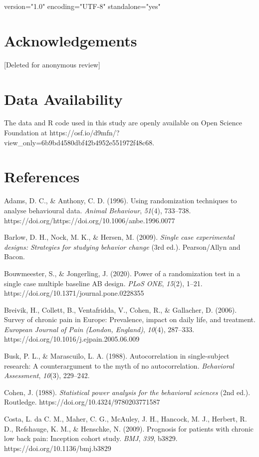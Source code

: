 version="1.0" encoding="UTF-8" standalone="yes" \documentclass{article}
\begin{document}
\section{Acknowledgements}

[Deleted for anonymous review]

\section{Data Availability}

The data and R code used in this study are openly available on Open Science Foundation at https://osf.io/d9mfn/?view\_only=6b9bd4580dbf42b4952e551972f48c68.



\section{References}

Adams, D. C., \& Anthony, C. D. (1996). Using randomization techniques to analyse behavioural data. \emph{Animal Behaviour}, \emph{51}(4), 733--738. https://doi.org/https://doi.org/10.1006/anbe.1996.0077

Barlow, D. H., Nock, M. K., \& Hersen, M. (2009). \emph{Single case experimental designs: Strategies for studying behavior change} (3rd ed.). Pearson/Allyn and Bacon.

Bouwmeester, S., \& Jongerling, J. (2020). Power of a randomization test in a single case multiple baseline AB design. \emph{PLoS ONE}, \emph{15}(2), 1--21. https://doi.org/10.1371/journal.pone.0228355

Breivik, H., Collett, B., Ventafridda, V., Cohen, R., \& Gallacher, D. (2006). Survey of chronic pain in Europe: Prevalence, impact on daily life, and treatment. \emph{European Journal of Pain (London, England)}, \emph{10}(4), 287--333. https://doi.org/10.1016/j.ejpain.2005.06.009

Busk, P. L., \& Marascuilo, L. A. (1988). Autocorrelation in single-subject research: A counterargument to the myth of no autocorrelation. \emph{Behavioral Assessment}, \emph{10}(3), 229--242.

Cohen, J. (1988). \emph{Statistical power analysis for the behavioral sciences} (2nd ed.). Routledge. https://doi.org/10.4324/9780203771587

Costa, L. da C. M., Maher, C. G., McAuley, J. H., Hancock, M. J., Herbert, R. D., Refshauge, K. M., \& Henschke, N. (2009). Prognosis for patients with chronic low back pain: Inception cohort study. \emph{BMJ}, \emph{339}, b3829. https://doi.org/10.1136/bmj.b3829
\end{document}
